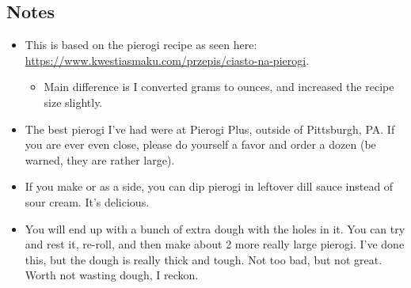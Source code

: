 \begin{multicols}{2}
\subsection*{Notes}
\begin{itemize}
    \item This is based on the pierogi recipe as seen here: \url{https://www.kwestiasmaku.com/przepis/ciasto-na-pierogi}.
    \begin{itemize}
        \item Main difference is I converted grams to ounces, and increased the recipe size slightly.
    \end{itemize}
    \item The best pierogi I've had were at Pierogi Plus, outside of Pittsburgh, PA. If you are ever even close, please do yourself a favor and order a dozen (be warned, they are rather large).
    \item If you make  or  as a side, you can dip pierogi in leftover dill sauce instead of sour cream. It's delicious.
    \item You will end up with a bunch of extra dough with the holes in it. You can try and rest it, re-roll, and then make about 2 more really large pierogi. I've done this, but the dough is really thick and tough. Not too bad, but not great. Worth not wasting dough, I reckon.
\end{itemize}
\end{multicols}
\clearpage